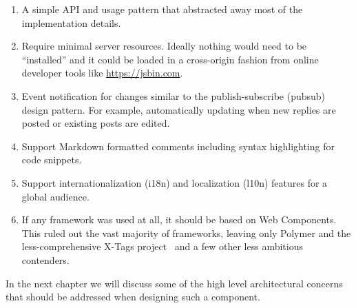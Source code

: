 \begin{enumerate}
\item A simple API and usage pattern that abstracted away most of the implementation details.\label{motive:abstraction}

\item Require minimal server resources. Ideally nothing would need to be ``installed'' and it could be loaded in a cross-origin fashion from online developer tools like \url{https://jsbin.com}.
\label{motive:cors}

\item Event notification for changes similar to the 
publish-subscribe (pubsub) design pattern.\label{motive:pubsub} 
For example, automatically updating when new replies are posted or existing posts are edited.

\item Support Markdown formatted comments including syntax highlighting for code snippets.\label{motive:markdown}

\item Support 
internationalization
(i18n) and 
localization (l10n) features for a global audience.\label{motive:i18n}

\item If any framework was used at all, it should be based on Web Components.\label{motive:webcomponents} This ruled out the vast majority of frameworks, 
leaving only Polymer and the less-comprehensive X-Tags project~\cite{x-tagscontributors2015} and a few other less ambitious contenders.

\end{enumerate}

In the next chapter we will discuss some of the high level architectural concerns that should be addressed when designing such a component.
 